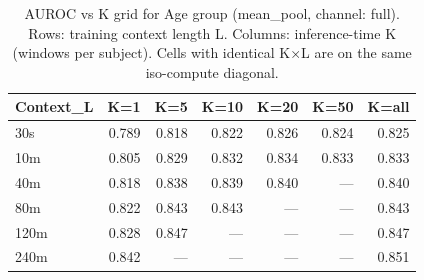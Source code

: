 \begin{table}[ht]
\centering
\caption{AUROC vs K grid for Age group (mean_pool, channel: full). Rows: training context length L. Columns: inference-time K (windows per subject). Cells with identical K×L are on the same iso-compute diagonal.}
\label{tab:kgrid_age_class_mean_pool_full}
\begin{tabular}{lrrrrrr}
\toprule
Context_L & K=1 & K=5 & K=10 & K=20 & K=50 & K=all \\
\midrule
30s & 0.789 & 0.818 & 0.822 & 0.826 & 0.824 & 0.825 \\
10m & 0.805 & 0.829 & 0.832 & 0.834 & 0.833 & 0.833 \\
40m & 0.818 & 0.838 & 0.839 & 0.840 & — & 0.840 \\
80m & 0.822 & 0.843 & 0.843 & — & — & 0.843 \\
120m & 0.828 & 0.847 & — & — & — & 0.847 \\
240m & 0.842 & — & — & — & — & 0.851 \\
\bottomrule
\end{tabular}
\end{table}